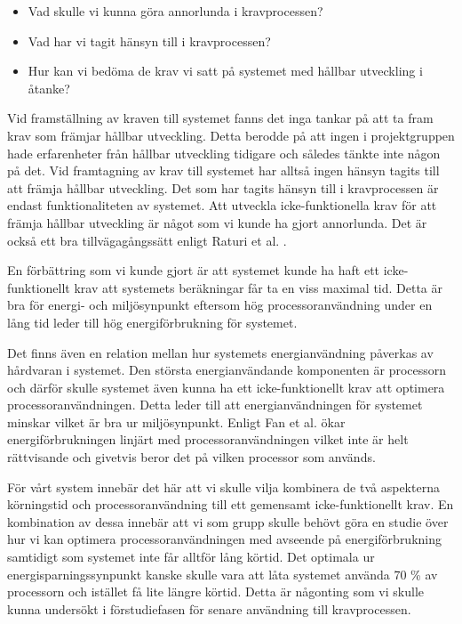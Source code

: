 \begin{itemize}
	\item Vad skulle vi kunna göra annorlunda i kravprocessen?
	\item Vad har vi tagit hänsyn till i kravprocessen?
	\item Hur kan vi bedöma de krav vi satt på systemet med hållbar utveckling i åtanke?
\end{itemize}

Vid framställning av kraven till systemet fanns det inga tankar på att ta fram krav som främjar hållbar utveckling. Detta berodde på att ingen i projektgruppen hade erfarenheter från hållbar utveckling tidigare och således tänkte inte någon på det. Vid framtagning av krav till systemet har alltså ingen hänsyn tagits till att främja hållbar utveckling. Det som har tagits hänsyn till i kravprocessen är endast funktionaliteten av systemet. Att utveckla icke-funktionella krav för att främja hållbar utveckling är något som vi kunde ha gjort annorlunda. Det är också ett bra tillvägagångssätt enligt Raturi et al. \cite{raturi2014developing}.

En förbättring som vi kunde gjort är att systemet kunde ha haft ett icke-funktionellt krav att systemets beräkningar får ta en viss maximal tid. Detta är bra för energi- och miljösynpunkt eftersom hög processoranvändning under en lång tid leder till hög energiförbrukning för systemet.

Det finns även en relation mellan hur systemets energianvändning påverkas av hårdvaran i systemet. Den största energianvändande komponenten är processorn och därför skulle systemet även kunna ha ett icke-funktionellt krav att optimera processoranvändningen. Detta leder till att energianvändningen för systemet minskar vilket är bra ur miljösynpunkt. Enligt Fan et al. \cite{fan2007power} ökar energiförbrukningen linjärt med processoranvändningen vilket inte är helt rättvisande och givetvis beror det på vilken processor som används.

För vårt system innebär det här att vi skulle vilja kombinera de två aspekterna körningstid och processoranvändning till ett gemensamt icke-funktionellt krav. En kombination av dessa innebär att vi som grupp skulle behövt göra en studie över hur vi kan optimera processoranvändningen med avseende på energiförbrukning samtidigt som systemet inte får alltför lång körtid. Det optimala ur energisparningssynpunkt kanske skulle vara att låta systemet använda 70 \% av processorn och istället få lite längre körtid. Detta är någonting som vi skulle kunna undersökt i förstudiefasen för senare användning till kravprocessen.

